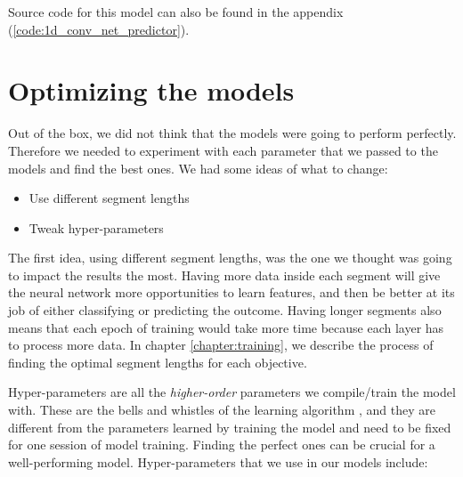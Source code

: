 Source code for this model can also be found in the appendix (\ref{code:1d_conv_net_predictor}).

\section{Optimizing the models}

\noindent Out of the box, we did not think that the models were going to perform perfectly. Therefore we needed to experiment with each parameter that we passed to the models and find the best ones. We had some ideas of what to change:

\begin{itemize}
    \item Use different segment lengths
    \item Tweak hyper-parameters
\end{itemize}

\noindent The first idea, using different segment lengths, was the one we thought was going to impact the results the most. Having more data inside each segment will give the neural network more opportunities to learn features, and then be better at its job of either classifying or predicting the outcome. Having longer segments also means that each epoch of training would take more time because each layer has to process more data. In chapter \ref{chapter:training}, we describe the process of finding the optimal segment lengths for each objective.

Hyper-parameters are all the \textit{higher-order} parameters we compile/train the model with. These are the bells and whistles of the learning algorithm \cite{hyperparameters}, and they are different from the parameters learned by training the model and need to be fixed for one session of model training. Finding the perfect ones can be crucial for a well-performing model. Hyper-parameters that we use in our models include:

